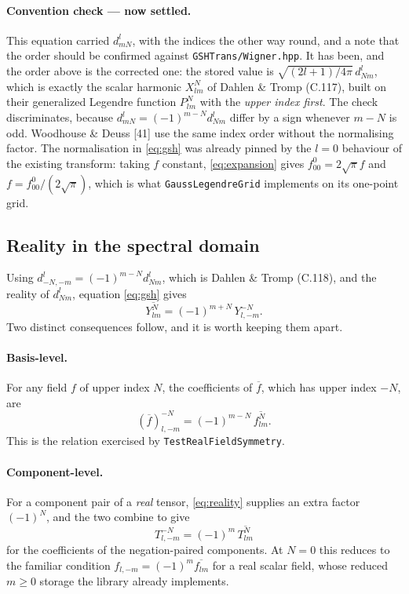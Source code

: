 \documentclass[11pt,a4paper]{article}
\newcommand{\conj}[1]{\overline{#1}}
\begin{document}
\paragraph{Convention check --- now settled.}  This equation carried
$d^{l}_{mN}$, with the indices the other way round, and a note that the
order should be confirmed against \texttt{GSHTrans/Wigner.hpp}.  It has been, and
the order above is the corrected one: the stored value is
$\sqrt{(2l+1)/4\pi}\,d^{l}_{Nm}$, which is exactly the scalar harmonic
$X^{N}_{lm}$ of Dahlen \& Tromp (C.117), built on their generalized
Legendre function $P^{N}_{lm}$ with the \emph{upper index first}.  The
check discriminates, because $d^{l}_{mN} = (-1)^{m-N} d^{l}_{Nm}$ differ
by a sign whenever $m-N$ is odd.  Woodhouse \& Deuss [41] use the same
index order without the normalising factor.  The
normalisation in \eqref{eq:gsh} was already pinned by the $l=0$ behaviour
of the existing transform: taking $f$ constant, \eqref{eq:expansion}
gives $f^{0}_{00} = 2\sqrt{\pi} f$ and $f = f^{0}_{00}/(2\sqrt{\pi})$,
which is what \texttt{GaussLegendreGrid} implements on its one-point
grid.

\subsection{Reality in the spectral domain}
\label{sec:spectralreality}

Using $d^{l}_{-N,-m} = (-1)^{m-N} d^{l}_{Nm}$, which is Dahlen \& Tromp
(C.118), and the reality of $d^{l}_{Nm}$, equation \eqref{eq:gsh} gives
\begin{equation}
  \conj{Y^{N}_{lm}} = (-1)^{m+N}\, Y^{-N}_{l,-m} .
  \label{eq:Yconj}
\end{equation}
Two distinct consequences follow, and it is worth keeping them apart.

\paragraph{Basis-level.}  For any field $f$ of upper index $N$, the
coefficients of $\conj{f}$, which has upper index $-N$, are
\begin{equation}
  \left(\conj{f}\right)^{-N}_{l,-m} = (-1)^{m-N}\, \conj{f^{N}_{lm}} .
  \label{eq:basiclevel}
\end{equation}
This is the relation exercised by \texttt{TestRealFieldSymmetry}.

\paragraph{Component-level.}  For a component pair of a \emph{real}
tensor, \eqref{eq:reality} supplies an extra factor $(-1)^{N}$, and the
two combine to give
\begin{equation}
  \boxed{\;
    T^{-N}_{l,-m} = (-1)^{m}\, \conj{T^{N}_{lm}}
  \;}
  \label{eq:complevel}
\end{equation}
for the coefficients of the negation-paired components.  At $N=0$ this
reduces to the familiar condition $f_{l,-m} = (-1)^m \conj{f_{lm}}$ for a
real scalar field, whose reduced $m \geq 0$ storage the library already
implements.
\end{document}
